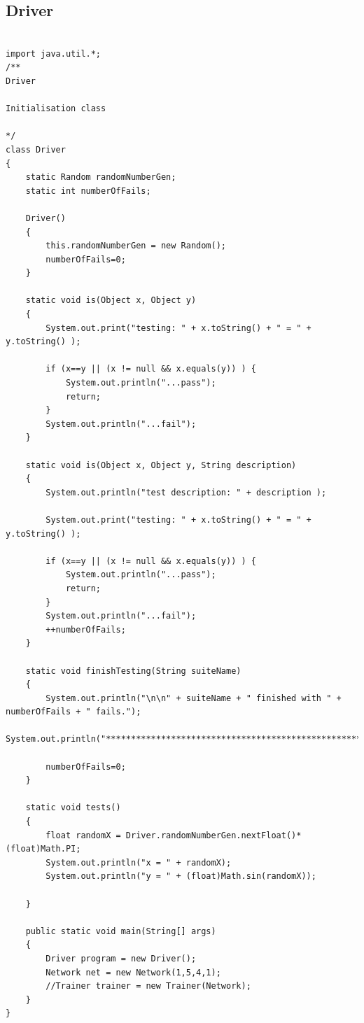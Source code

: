 \documentclass[11pt]{article} %
\begin{document}
\subsection{Driver}
\begin{lstlisting}

import java.util.*;
/**
Driver

Initialisation class
 
*/
class Driver
{
    static Random randomNumberGen;
    static int numberOfFails;
    
    Driver()
    {
        this.randomNumberGen = new Random();
        numberOfFails=0;
    }
    
    static void is(Object x, Object y)
    {
        System.out.print("testing: " + x.toString() + " = " + y.toString() );

        if (x==y || (x != null && x.equals(y)) ) {
            System.out.println("...pass");
            return;
        }
        System.out.println("...fail");
    }
    
    static void is(Object x, Object y, String description)
    {
        System.out.println("test description: " + description );

        System.out.print("testing: " + x.toString() + " = " + y.toString() );

        if (x==y || (x != null && x.equals(y)) ) {
            System.out.println("...pass");
            return;
        }
        System.out.println("...fail");
        ++numberOfFails;
    }
    
    static void finishTesting(String suiteName)
    {
        System.out.println("\n\n" + suiteName + " finished with " + numberOfFails + " fails.");
        System.out.println("***************************************************************\n\n");

        numberOfFails=0;
    }
    
    static void tests()
    {
        float randomX = Driver.randomNumberGen.nextFloat()*(float)Math.PI;
        System.out.println("x = " + randomX);
        System.out.println("y = " + (float)Math.sin(randomX));

    }

    public static void main(String[] args)
    {
        Driver program = new Driver();
        Network net = new Network(1,5,4,1);
        //Trainer trainer = new Trainer(Network);
    }
}
\end{lstlisting}
\end{document}
